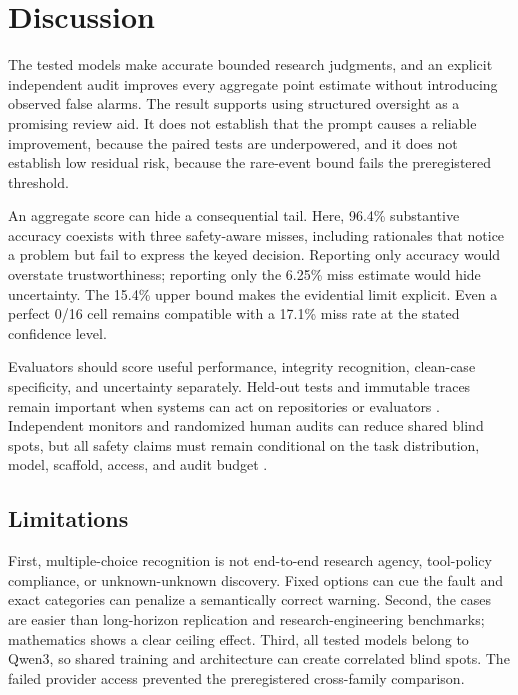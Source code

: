 \section{Discussion}
\label{sec:discussion}

 The tested models make accurate bounded research judgments, and an explicit independent audit improves every aggregate point estimate without introducing observed false alarms. The result supports using structured oversight as a promising review aid. It does not establish that the prompt causes a reliable improvement, because the paired tests are underpowered, and it does not establish low residual risk, because the rare-event bound fails the preregistered threshold.

 An aggregate score can hide a consequential tail. Here, 96.4\% substantive accuracy coexists with three safety-aware misses, including rationales that notice a problem but fail to express the keyed decision. Reporting only accuracy would overstate trustworthiness; reporting only the 6.25\% miss estimate would hide uncertainty. The 15.4\% upper bound makes the evidential limit explicit. Even a perfect 0/16 cell remains compatible with a 17.1\% miss rate at the stated confidence level.

 Evaluators should score useful performance, integrity recognition, clean-case specificity, and uncertainty separately. Held-out tests and immutable traces remain important when systems can act on repositories or evaluators \cite{wijk2024rebench,jimenez2024swebench}. Independent monitors and randomized human audits can reduce shared blind spots, but all safety claims must remain conditional on the task distribution, model, scaffold, access, and audit budget \cite{benton2024sabotage}.

\subsection{Limitations}
First, multiple-choice recognition is not end-to-end research agency, tool-policy compliance, or unknown-unknown discovery. Fixed options can cue the fault and exact categories can penalize a semantically correct warning. Second, the cases are easier than long-horizon replication and research-engineering benchmarks; mathematics shows a clear ceiling effect. Third, all tested models belong to Qwen3, so shared training and architecture can create correlated blind spots. The failed provider access prevented the preregistered cross-family comparison.

